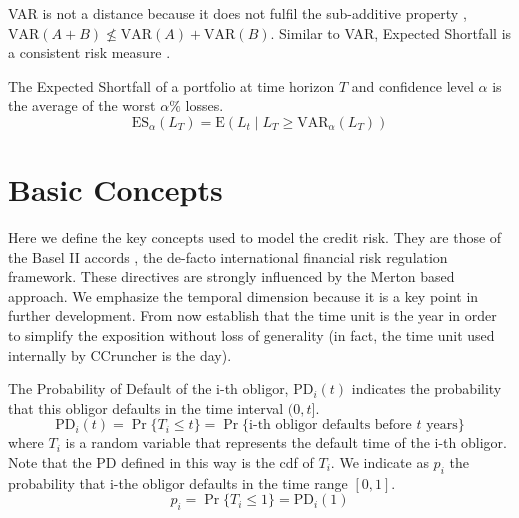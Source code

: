 \documentclass[11pt,fleqn]{book} %
\begin{document}
VAR is not a distance because it does not fulfil the sub-additive property 
\cite{var:varbad}, $\text{VAR}(A+B) \nleq \text{VAR}(A)+\text{VAR}(B)$. 
Similar to VAR, Expected Shortfall is a consistent risk measure 
\cite{var:eshortfall}.

\begin{definition}
	The Expected Shortfall of a portfolio at time horizon $T$ and 
	confidence level $\alpha$ is the average of the worst $\alpha\%$ losses.
	\begin{displaymath}
		\text{ES}_\alpha(L_T) = \text{E}(L_t \mid L_T \ge \text{VAR}_\alpha(L_T))
	\end{displaymath}
\end{definition}

\section{Basic Concepts}
\label{basic_concepts}

Here we define the key concepts used to model the credit risk.
They are those of the Basel II accords \cite{basel2:2006}, the 
de-facto international financial risk regulation framework. These
directives are strongly influenced by the Merton based approach.
We emphasize the temporal dimension because it is a key point in 
further development. From now establish that the time unit is the 
year in order to simplify the exposition without loss of generality
(in fact, the time unit used internally by CCruncher is the day).

\begin{definition}
	The Probability of Default of the i-th obligor, $\text{PD}_i(t)$
	indicates the probability that this obligor defaults in the time 
	interval $(0,t]$.
	\begin{displaymath}
		\text{PD}_i(t) = \Pr\{T_i \le t\} = 
		\Pr\{\text{i-th obligor defaults before $t$ years}\}
	\end{displaymath}
	where $T_i$ is a random variable that represents the default
	time of the i-th obligor. Note that the PD defined in this way 
	is the cdf of $T_i$. We indicate as $p_i$ the probability that 
	i-the obligor defaults in the time range $[0,1]$.
	\begin{displaymath}
		p_i = \Pr\{T_i \le 1\} = \text{PD}_i(1) 
	\end{displaymath}
\end{definition}
\end{document}

